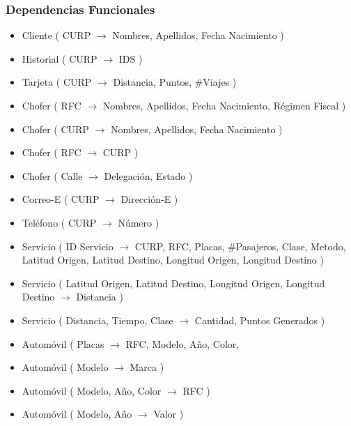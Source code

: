 \documentclass{article}
\begin{document}
       { \noindent
         \subsubsection*{Dependencias Funcionales}
           \begin{itemize}
           \item Cliente ( CURP $\rightarrow$ Nombres, Apellidos, Fecha Nacimiento )
             
           \item Historial ( CURP $\rightarrow$ IDS )
             
           \item Tarjeta ( CURP $\rightarrow$ Distancia, Puntos, #Viajes )
             
           \item Chofer ( RFC $\rightarrow$ Nombres, Apellidos, Fecha Nacimiento, Régimen Fiscal )
           \item Chofer ( CURP $\rightarrow$ Nombres, Apellidos, Fecha Nacimiento )
           \item Chofer ( RFC $\rightarrow$ CURP )
           \item Chofer ( Calle $\rightarrow$ Delegación, Estado )

           \item Correo-E ( CURP $\rightarrow$ Dirección-E )

           \item Teléfono ( CURP $\rightarrow$ Número )
             
           \item Servicio ( ID Servicio  $\rightarrow$ CURP, RFC, Placas, #Pasajeros, Clase, Metodo,
             Latitud Origen, Latitud Destino, Longitud Origen, Longitud Destino )
           \item Servicio ( Latitud Origen, Latitud Destino, Longitud Origen, Longitud Destino
             $\rightarrow$ Distancia )
           \item Servicio ( Distancia, Tiempo, Clase $\rightarrow$ Cantidad, Puntos Generados )

           \item Automóvil ( Placas $\rightarrow$ RFC, Modelo, Año, Color,
           \item Automóvil ( Modelo $\rightarrow$ Marca )
           \item Automóvil ( Modelo, Año, Color $\rightarrow$ RFC )
           \item Automóvil ( Modelo, Año $\rightarrow$ Valor )
             
           \end{itemize}
       }
\end{document}
